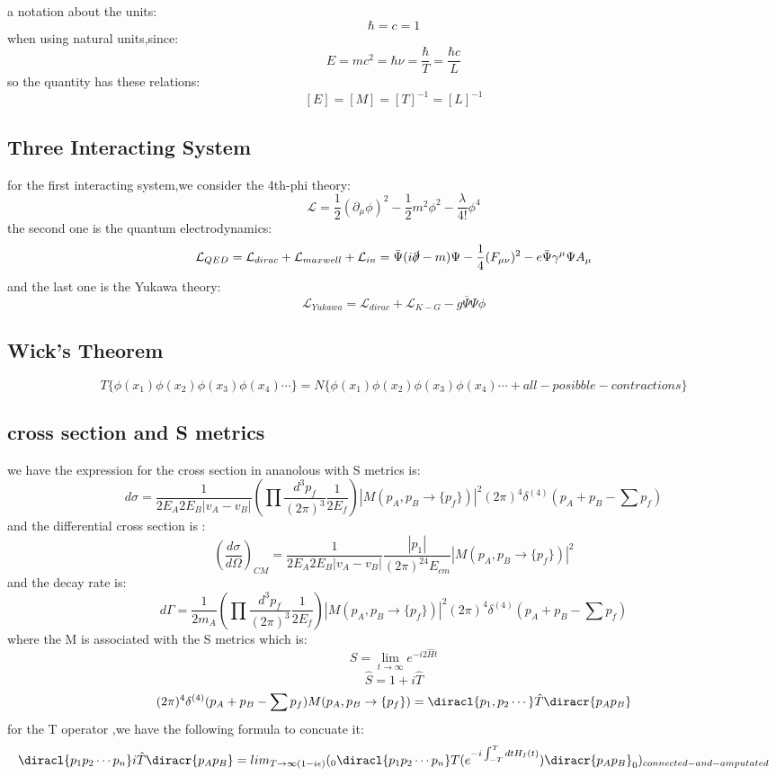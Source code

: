 a notation about the units:
\[\hbar=c=1\]
when using natural units,since:
\[E=mc^2=\hbar\nu=\frac{\hbar}{T}=\frac{\hbar c}{L}\]
so the quantity has these relations:
\[[E]=[M]=[T]^{-1}=[L]^{-1}\]
\subsection{Three Interacting System}
for the first interacting system,we consider the 4th-phi theory:
\[\mathcal{L}=\frac{1}{2}(\partial_\mu\phi)^2-\frac{1}{2}m^2\phi^2-\frac{\lambda}{4!}\phi^4\]
the second one is the quantum electrodynamics:
\[\mathcal{L}_{QED}=\mathcal{L}_{dirac} +\mathcal{L}_{maxwell}+\mathcal{L}_{in}=\bar{\Psi}(i\slashed{\partial}-m)\Psi-\frac{1}{4}(F_{\mu\nu})^2-e\bar{\Psi}\gamma^\mu\Psi A_\mu\]
and the last one is the Yukawa theory:
\[\mathcal{L}_{Yukawa}=\mathcal{L}_{dirac}+\mathcal{L}_{K-G}-g\bar{\Psi}\Psi\phi\]
\subsection{Wick's Theorem}
\[T\{\phi(x_1)\phi(x_2)\phi(x_3)\phi(x_4)\cdots\}=N\{\phi(x_1)\phi(x_2)\phi(x_3)\phi(x_4)\cdots+all-posibble-contractions\}\]
\subsection{cross section and S metrics}
we have the expression for the cross section in ananolous with S metrics is:
\[d\sigma=\frac{1}{2E_A2E_B|v_A-v_B|}(\prod\frac{d^3p_f}{(2\pi)^3}\frac{1}{2E_f})|M(p_A,p_B\rightarrow \{p_f\})|^2(2\pi)^4\delta^{(4)}(p_A+p_B-\sum p_f)\]
and the differential cross section is :
\[(\frac{d\sigma}{d\Omega})_{CM}=\frac{1}{2E_A2E_B|v_A-v_B|}\frac{|p_1|}{(2\pi)^24E_{cm}}|M(p_A,p_B\rightarrow \{p_f\})|^2\]
and the decay rate is:
\[d\Gamma=\frac{1}{2m_A}(\prod\frac{d^3p_f}{(2\pi)^3}\frac{1}{2E_f})|M(p_A,p_B\rightarrow \{p_f\})|^2(2\pi)^4\delta^{(4)}(p_A+p_B-\sum p_f)\]
where the M is associated with  the S metrics which is:
\[\hat{S}=\lim_{t\rightarrow \infty}e^{-i2\hat{H}t}\]
\[\hat{S}=1+i\hat{T}\]
\[(2\pi)^4\delta^{(4)}(p_A+p_B-\sum p_f)M(p_A,p_B\rightarrow \{p_f\})=\diracl{p_1,p_2\cdots} \hat{T}\diracr{p_Ap_B}\]
for the T operator ,we have the following formula to concuate it:
\[\diracl{p_1p_2\cdots p_n}i\hat{T}\diracr{p_Ap_B}=lim_{T\rightarrow\infty(1-i\epsilon)}({}_0\diracl{p_1p_2\cdots p_n}T({e^{-i\int_{-T}^TdtH_I(t)}})\diracr{p_Ap_B}_0)_{connected-and-amputated}\]